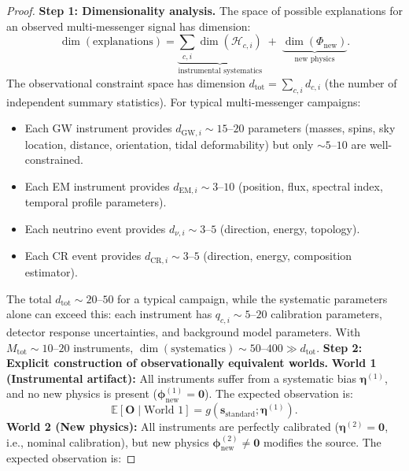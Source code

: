 \documentclass[11pt,a4paper]{article}
\theoremstyle{definition}
\newcommand{\E}{\mathbb{E}}
\begin{document}
\begin{proof}
\textbf{Step 1: Dimensionality analysis.}
The space of possible explanations for an observed multi-messenger signal has dimension:
\begin{equation}
\dim(\text{explanations}) = \underbrace{\sum_{c,i} \dim(\mathcal{H}_{c,i})}_{\text{instrumental systematics}} \;+\; \underbrace{\dim(\Phi_{\mathrm{new}})}_{\text{new physics}}.
\end{equation}
The observational constraint space has dimension $d_{\mathrm{tot}} = \sum_{c,i} d_{c,i}$ (the number of independent summary statistics). For typical multi-messenger campaigns:
\begin{itemize}
    \item Each GW instrument provides $d_{\mathrm{GW},i} \sim 15$--$20$ parameters (masses, spins, sky location, distance, orientation, tidal deformability) but only $\sim 5$--$10$ are well-constrained.
    \item Each EM instrument provides $d_{\mathrm{EM},i} \sim 3$--$10$ (position, flux, spectral index, temporal profile parameters).
    \item Each neutrino event provides $d_{\nu,i} \sim 3$--$5$ (direction, energy, topology).
    \item Each CR event provides $d_{\mathrm{CR},i} \sim 3$--$5$ (direction, energy, composition estimator).
\end{itemize}
The total $d_{\mathrm{tot}} \sim 20$--$50$ for a typical campaign, while the systematic parameters alone can exceed this: each instrument has $q_{c,i} \sim 5$--$20$ calibration parameters, detector response uncertainties, and background model parameters. With $M_{\mathrm{tot}} \sim 10$--$20$ instruments, $\dim(\text{systematics}) \sim 50$--$400 \gg d_{\mathrm{tot}}$.
\textbf{Step 2: Explicit construction of observationally equivalent worlds.}
\textbf{World 1 (Instrumental artifact):} All instruments suffer from a systematic bias $\boldsymbol{\eta}^{(1)}$, and no new physics is present ($\boldsymbol{\phi}_{\mathrm{new}}^{(1)} = \mathbf{0}$). The expected observation is:
\begin{equation}
\E[\mathbf{O} \mid \text{World 1}] = g(\mathbf{s}_{\mathrm{standard}}; \boldsymbol{\eta}^{(1)}).
\end{equation}
\textbf{World 2 (New physics):} All instruments are perfectly calibrated ($\boldsymbol{\eta}^{(2)} = \mathbf{0}$, i.e., nominal calibration), but new physics $\boldsymbol{\phi}_{\mathrm{new}}^{(2)} \neq \mathbf{0}$ modifies the source. The expected observation is:

\end{proof}
\end{document}
